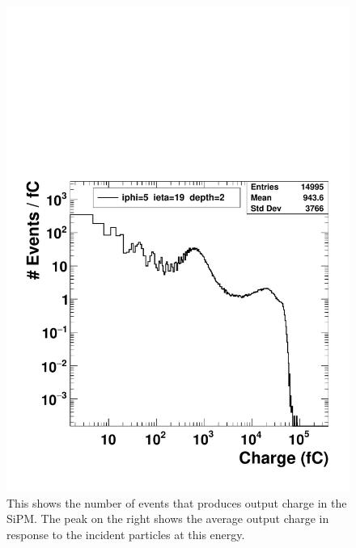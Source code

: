 \begin{figure}
\centering
\includegraphics[width=0.7\linewidth]{Figures/pioncharge.pdf}
\caption{This shows the number of events that produces output charge in the SiPM. The peak on the right shows the average output charge in response to the incident particles at this energy.}
\label{fig:pioncharge}
\end{figure}

